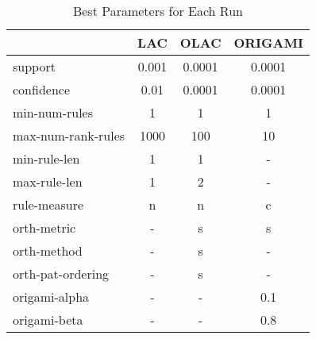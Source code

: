 \begin{table}[htbp]
	\centering
		\renewcommand{\tabcolsep}{1.8mm}
		\begin{tabular}{|l|c|c|c|}
		\hline
					& \textbf{LAC}	& \textbf{OLAC}	& \textbf{ORIGAMI}	\\
		\hline
		support			& 0.001	& 0.0001	& 0.0001		\\
		\hline
		confidence		& 0.01		& 0.0001	& 0.0001		\\
		\hline
		min-num-rules		& 1		& 1		& 1			\\
		\hline
		max-num-rank-rules	& 1000		& 100		& 10			\\
		\hline
		min-rule-len		& 1		& 1		& -			\\
		\hline
		max-rule-len		& 1		& 2		& -			\\
		\hline
		rule-measure		& n		& n		& c			\\
		\hline
		orth-metric		& -		& s		& s			\\
		\hline
		orth-method		& -		& s		& -			\\
		\hline
		orth-pat-ordering	& -		& s		& -			\\
		\hline
		origami-alpha		& -		& -		& 0.1			\\
		\hline
		origami-beta		& -		& -		& 0.8			\\
		\hline
		\end{tabular}
	\caption{Best Parameters for Each Run}
	\label{tab:best_parms_for_avg_db}
\end{table}